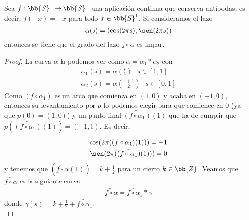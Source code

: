 \begin{lema}
    Sea $f:\bb{S}^1 \to \bb{S}^1$ una aplicación continua que conserva antípodas, es decir, $f(-x)=-x$ para todo $x\in \bb{S}^1$. Si consideramos el lazo
    \begin{gather*}
        \alpha(s) = (\cos(2\pi s), \sen(2\pi s))
    \end{gather*}
    entonces se tiene que el grado del lazo $f\circ \alpha$ es impar.
    \begin{proof}
        La curva $\alpha$ la podemos ver como $\alpha = \alpha_1 \ast \alpha_2$ con
        \begin{gather*}
            \alpha_1(s) = \alpha\left(\frac{s}{2}\right) \ \ \ s\in[0,1]\\
            \alpha_2(s) = \alpha\left(\frac{s+1}{2}\right) \ \ \ s\in[0,1]
        \end{gather*}
        Como $(f \circ \alpha_1)$ es un arco que comienza en $(1,0)$ y acaba en $(-1,0)$, entonces su levantamiento por $p$ lo podemos elegir para que comience en $0$ (ya que $p(0)=(1,0)$) y un punto final $\tilde{(f \circ \alpha_1)}(1)$ que ha de cumplir que $p(\tilde{(f\circ \alpha_1)}(1))=(-1,0)$. Es decir,
        \begin{gather*}
            \cos(2\pi (\tilde{(f\circ \alpha_1)}(1))) = -1\\
            \sen(2\pi (\tilde{(f\circ \alpha_1)}(1))) = 0
        \end{gather*}
        y tenemos que $(\tilde{f\circ \alpha}(1)) = k + \frac{1}{2}$ para un cierto $k\in \bb{Z}$. Veamos que $\tilde{f\circ \alpha}$ es la siguiente curva
        \begin{gather*}
            \tilde{f\circ \alpha} = \tilde{f\circ \alpha_1} \ast \gamma
        \end{gather*}
        donde $\gamma(s) = k + \frac{1}{2} + \tilde{f\circ \alpha_1}$.\\


\end{proof}
\end{lema}
